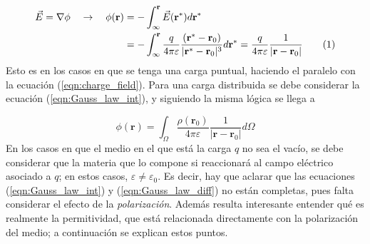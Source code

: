\documentclass[12pt, twoside, onehalfspace, numbers, spanish]{ezthesis}
\newcommand\numberthis{\addtocounter{equation}{1}\tag{\theequation}}
\numberwithin{equation}{section}
\begin{document}
\begin{align*}\label{eqn:potential}
\vec{E} = \nabla\phi \quad\rightarrow\quad\phi{(\mathbf{r})} & = -\int_\infty^{\mathbf{r}} \vec{E}(\mathbf{r}^*) d\mathbf{r}^* \\
& = -\int_\infty^{\mathbf{r}} \frac{q}{4\pi\varepsilon}\frac{(\mathbf{r}^*-\mathbf{r}_0)}{|\mathbf{r}^* - \mathbf{r}_0|^3} d\mathbf{r}^* = \frac{q}{4\pi\varepsilon}\frac{1}{|\mathbf{r} - \mathbf{r}_0|}\numberthis
\end{align*}
\noindent
Esto es en los casos en que se tenga una carga puntual, haciendo el paralelo con la ecuación (\ref{eqn:charge_field}). Para una carga distribuida se debe considerar la ecuación (\ref{eqn:Gauss_law_int}), y siguiendo la misma lógica se llega a

\begin{equation}\label{eqn:integral_potential}
\phi(\mathbf{r}) = \int_\Omega \frac{\rho(\mathbf{r}_0)}{4\pi\varepsilon}\frac{1}{|\mathbf{r}-\mathbf{r}_0|}d\Omega
\end{equation}
\noindent
En los casos en que el medio en el que está la carga $q$ no sea el vacío, se debe considerar que la materia que lo compone si reaccionará al campo eléctrico asociado a $q$; en estos casos, $\varepsilon \neq \varepsilon_0$. Es decir, hay que aclarar que las ecuaciones (\ref{eqn:Gauss_law_int}) y (\ref{eqn:Gauss_law_diff}) no están completas, pues falta considerar el efecto de la \textit{polarización}. Además resulta interesante entender qué es realmente la permitividad, que está relacionada directamente con la polarización del medio; a continuación se explican estos puntos.
\end{document}
